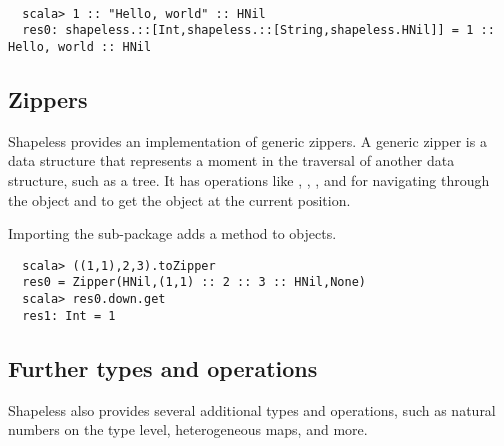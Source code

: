 \begin{example} {\ } %
\begin{lstlisting}
  scala> 1 :: "Hello, world" :: HNil
  res0: shapeless.::[Int,shapeless.::[String,shapeless.HNil]] = 1 :: Hello, world :: HNil
\end{lstlisting}
\end{example}

\subsection{Zippers}
Shapeless provides an implementation of generic zippers. A generic zipper is
a data structure that represents a moment in the traversal of another data
structure, such as a tree. It has operations like , , ,
and  for navigating through the object and  to get the object
at the current position.

\begin{example}
Importing the  sub-package adds a  method to objects.

\begin{lstlisting}
  scala> ((1,1),2,3).toZipper
  res0 = Zipper(HNil,(1,1) :: 2 :: 3 :: HNil,None)
  scala> res0.down.get
  res1: Int = 1
\end{lstlisting}
\end{example}

\subsection{Further types and operations}
Shapeless also provides several additional types and operations, such as
natural numbers on the type level, heterogeneous maps, and more.
